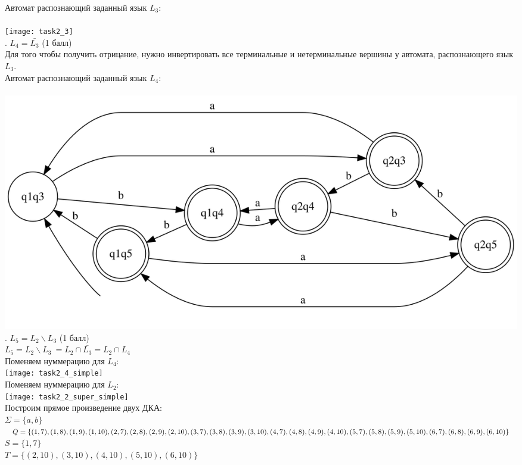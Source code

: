 \documentclass{article}
\begin{document}
\normalsize{Автомат распознающий заданный язык \(L_3\): }\\\\
\texttt{[image: task2\_3]}\\
\hfill {}. \(L_4 = \bar{L_3}\) (1 балл)\\
\hfill \break
\normalsize{Для того чтобы получить отрицание,  нужно инвертировать все терминальные и нетерминальные вершины у автомата, распознающего язык \(L_3\).}\\
\normalsize{Автомат распознающий заданный язык \(L_4\): }\\\\
\includegraphics [scale=0.7]{task2_4}\\
\hfill {}. \(L_5 = L_2 \backslash L_3\) (1 балл)\\
\hfill \break
 \(L_5 = L_2 \backslash L_3\ = L_2 \cap \bar{L_3} =  L_2 \cap L_4\)\\
\normalsize{Поменяем нуммерацию для \(L_4\): }\\
\texttt{[image: task2\_4\_simple]}\\
\normalsize{Поменяем нуммерацию для \(L_2\): }\\
\texttt{[image: task2\_2\_super\_simple]}\\
\normalsize{Построим прямое произведение двух ДКА:}\\
\(\Sigma = \{a,b\}\)\\
\(Q = \{(1,7),(1,8),(1,9),(1,10),\\
(2,7),(2,8),(2,9),(2,10),\\
(3,7),(3,8),(3,9),(3,10),\\
(4,7),(4,8),(4,9),(4,10),\\
(5,7),(5,8),(5,9),(5,10),\\
(6,7),(6,8),(6,9),(6,10)\}\)\\
\(S = \{1,7\}\)\\
\(T = \{(2,10),(3,10),(4,10),(5,10),(6,10)\}\)\\
\end{document}
